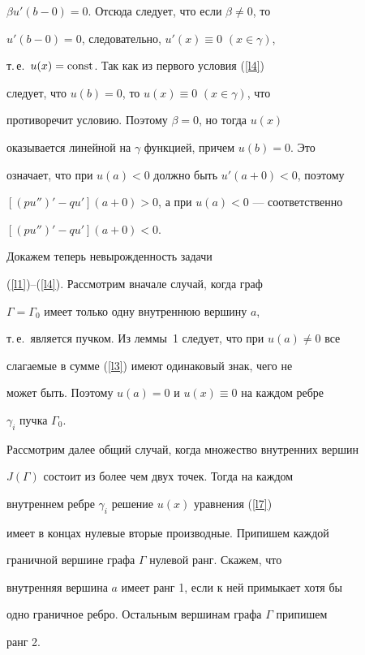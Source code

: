 {{{{{{{\begin{pf}
$\beta u'(b-0)=0$. Отсюда следует, что если $\beta \ne 0$, то


$u'(b-0)=0$, следовательно, $u'(x)\equiv 0$ $(x\in \gamma)$,


т.\,е.~$u(x)=\operatorname{const}$. Так как из первого условия (\ref{l4})


следует, что $u(b)=0$, то $u(x)\equiv 0$ $(x\in \gamma)$, что


противоречит условию. Поэтому $\beta = 0$, но тогда $u(x)$


оказывается линейной на $\gamma$ функцией, причем $u(b)=0$. Это


означает, что при $u(a)<0$ должно быть $u'(a+0)<0$, поэтому


$[(pu'')'-qu'](a+0)>0$, а при $u(a)<0$ --- соответственно


$[(pu'')'-qu'](a+0)<0$.


\end{pf}





Докажем теперь невырожденность задачи


(\ref{l1})--(\ref{l4}). Рассмотрим вначале случай, когда граф


$\Gamma=\Gamma_0$ имеет только одну внутреннюю вершину $a$,


т.\,е.~является пучком. Из леммы~1 следует, что при $u(a)\ne 0$ все


слагаемые в сумме (\ref{l3}) имеют одинаковый знак, чего не


может быть. Поэтому $u(a) = 0$ и $u(x)\equiv0$ на каждом ребре


$\gamma_i$ пучка $\Gamma_0$.





Рассмотрим далее общий случай, когда множество внутренних вершин


$J(\Gamma)$ состоит из более чем двух точек. Тогда на каждом


внутреннем ребре $\gamma_i$ решение $u(x)$ уравнения (\ref{l7})


имеет в концах нулевые вторые производные. Припишем каждой


граничной вершине графа $\Gamma$ нулевой ранг. Скажем, что


внутренняя вершина $a$ имеет ранг 1, если к ней примыкает хотя бы


одно граничное ребро. Остальным вершинам графа $\Gamma$ припишем


ранг 2.





}}}}}}}
